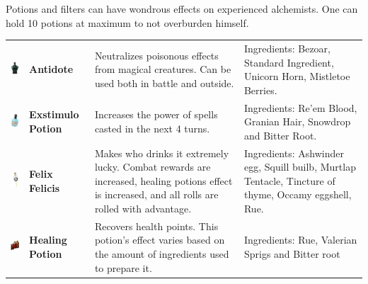 Potions and filters can have wondrous effects on experienced alchemists. One can hold 10 potions at maximum to not overburden himself. \\

\begin{tabular}{m{2cm}m{2cm}m{6cm}m{5cm} } 
	\includegraphics[width=2cm]{../Pictures/Gameplay/Items/Consumables/Potions/Antidote_potion_picture.png} & \textbf{Antidote} & Neutralizes poisonous effects from magical creatures. Can be used both in battle and outside. & Ingredients: Bezoar, Standard Ingredient, Unicorn Horn, Mistletoe Berries. \\ 
	\includegraphics[width=2cm]{../Pictures/Gameplay/Items/Consumables/Potions/Exstimulo_potion_picture.png} & \textbf{Exstimulo Potion} & Increases the power of spells casted in the next 4 turns. & Ingredients: Re'em Blood, Granian Hair, Snowdrop and Bitter Root. \\ 
	\includegraphics[width=2cm]{../Pictures/Gameplay/Items/Consumables/Potions/Felix_felicis_potion_picture.png} & \textbf{Felix Felicis} & Makes who drinks it extremely lucky. Combat rewards are increased, healing potions effect is increased, and all rolls are rolled with advantage. & Ingredients: Ashwinder egg, Squill builb, Murtlap Tentacle, Tincture of thyme, Occamy eggshell, Rue. \\ 
	\includegraphics[width=2cm]{../Pictures/Gameplay/Items/Consumables/Potions/Healing_potion_picture.png} & \textbf{Healing Potion} & Recovers health points. This potion's effect varies based on the amount of ingredients used to prepare it. & Ingredients: Rue, Valerian Sprigs and Bitter root \\ 

\end{tabular}
